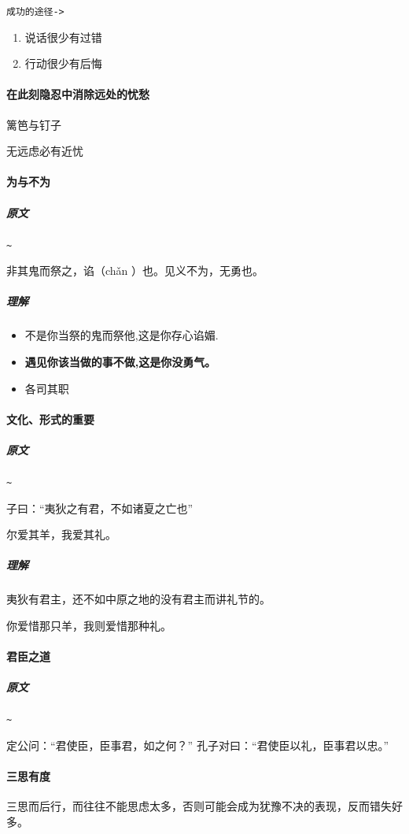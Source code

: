 \documentclass[UTF8,a4paper,8pt]{ctexbook}
\begin{document}
				
			\verb|成功的途径->|
				\begin{enumerate}[itemindent = 2em]
					\item 说话很少有过错
					\item 行动很少有后悔								
				\end{enumerate}

			
		\paragraph{在此刻隐忍中消除远处的忧愁} 篱笆与钉子
		
			无远虑必有近忧
		
		\paragraph{为与不为}
			\subparagraph{原文}\verb|~|
			
			 	非其鬼而祭之，谄（chǎn ）也。见义不为，无勇也。
			
			\subparagraph{理解}
				\begin{itemize}[itemindent=1em]
					\item 不是你当祭的鬼而祭他,这是你存心谄媚.
					\item \textbf{遇见你该当做的事不做,这是你没勇气。}
					\item 各司其职
				\end{itemize}
		
		\paragraph{文化、形式的重要}
			\subparagraph{原文}\verb|~|
				
				子曰：“夷狄之有君，不如诸夏之亡也”
			
				尔爱其羊，我爱其礼。
				
			\subparagraph{理解}
				夷狄有君主，还不如中原之地的没有君主而讲礼节的。
				
				你爱惜那只羊，我则爱惜那种礼。
		
		\paragraph{君臣之道}
			\subparagraph{原文}\verb|~|
			
				定公问：“君使臣，臣事君，如之何？” 孔子对曰：“君使臣以礼，臣事君以忠。”
			
		
		\paragraph{三思有度}
			三思而后行，而往往不能思虑太多，否则可能会成为犹豫不决的表现，反而错失好多。
			
\end{document}
